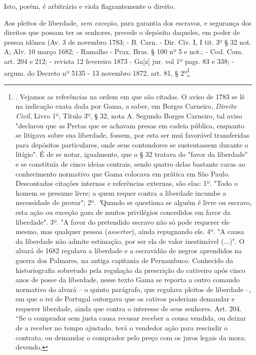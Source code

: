 Isto, porém, é arbitrário e viola flagrantemente o direito.

Aos pleitos de liberdade, \emph{sem exceção}, para garantia dos
escravos, e segurança dos direitos que possam ter os senhores, precede o
depósito daqueles, em poder de pessoa idônea (Av. 3 de novembro 1783; -
B. Carn. - Dir. Civ. I, I tit. 3º § 32 not. A; Alv. 10 março 1682; -
Ramalho - Prax. Bras. § 100 nº 5 e not.; - Cod. Com. art. 204 e 212; -
revista 12 fevereiro 1873 - Ga{[}z{]} jur. vol 1º pags. 83 e 338; -
argum. do Decreto nº 5135 - 13 novembro 1872, art. 81, § 2º\footnote{.
  Vejamos as referências na ordem em que são citadas. O aviso de 1783 se
  lê na indicação exata dada por Gama, a saber, em Borges Carneiro,
  \emph{Direito Civil}, Livro 1º, Título 3º, § 32, nota A. Segundo
  Borges Carneiro, tal aviso "declarou que as Pretas que se achavam
  presas em cadeia pública, enquanto se litigava sobre sua liberdade,
  fossem, por esta ser mui favorável transferidas para depósitos
  particulares, onde seus contendores se sustentassem durante o
  litígio". É de se notar, igualmente, que o § 32 tratava do "favor da
  liberdade" e se constituía de cinco ideias centrais, sendo quatro
  delas bastante caras ao conhecimento normativo que Gama colocava em
  prática em São Paulo. Descontadas citações internas e referências
  externas, são elas: 1º. "Todo o homem se presume livre; a quem requer
  contra a liberdade incumbe a necessidade de provar"; 2º.
  \emph{"}Quando se questiona se alguém é livre ou escravo, esta ação ou
  exceção goza de muitos privilégios concedidos em favor da liberdade".
  3º. "A favor do pretendido escravo não só pode requerer ele mesmo, mas
  qualquer pessoa (\emph{assertor}), ainda repugnando ele. 4º. "A causa
  da liberdade não admite estimação, por ser ela de valor inestimável
  (...)". O alvará de 1682 regulava a liberdade e a escravidão de negros
  aprendidos na guerra dos Palmares, na antiga capitania de Pernambuco.
  Conhecido da historiografia sobretudo pela regulação da prescrição do
  cativeiro após cinco anos de posse da liberdade, nesse texto Gama se
  reporta a outro comando normativo do alvará -- o quinto parágrafo, que
  regulava pleitos de liberdade --, em que o rei de Portugal outorgava
  que os cativos poderiam demandar e requerer liberdade, ainda que
  contra o interesse de seus senhores. Art. 204. ``Se o comprador sem
  justa causa recusar receber a cousa vendida, ou deixar de a receber no
  tempo ajustado, terá o vendedor ação para rescindir o contrato, ou
  demandar o comprador pelo preço com os juros legais da mora; devendo,
}
